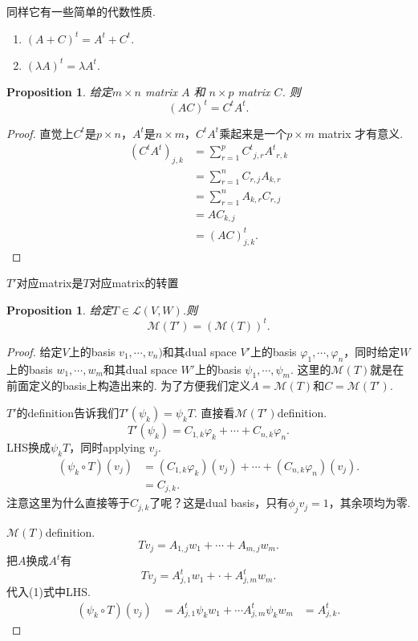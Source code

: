 \documentclass{article}
\newtheorem{proposition}[theorem]{Proposition}
\begin{document}
{\color{red} 同样它有一些简单的代数性质}.
\begin{enumerate}
	\item $(A+C)^t = A^t + C^t.$
	\item $(\lambda A)^t = \lambda A^t.$ 
\end{enumerate}

\begin{proposition}
\rm 给定$m\times n$ matrix $A$ 和 $n \times p$ matrix $C$. 则
$$
	(AC)^t = C^tA^t.
$$
\end{proposition}

\begin{proof}
直觉上$C^t$是$p\times n$，$A^t$是$n \times m$，$C^tA^t$乘起来是一个$p \times m$ matrix 才有意义.
$$
\begin{aligned}
(C^tA^t)_{j,k} &= \sum\limits_{r=1}^p {C^t}_{j,r}{A^t}_{r,k} \\
			&= \sum\limits_{r=1}^n {C}_{r,j}{A}_{k,r} \\
			&= \sum\limits_{r=1}^n {A}_{k,r}{C}_{r,j} \\
			&= AC_{k,j} \\
			&= (AC)^t_{j,k}.
\end{aligned}
$$
\end{proof}

{\color{red} $T'$对应matrix是$T$对应matrix的转置}

\begin{proposition}\label{dual-map: matrix-representation}
给定$T \in \mathcal{L}(V,W)$.则
$$
	\mathcal{M}(T') = (\mathcal{M}(T))^t.
$$
\end{proposition}

\begin{proof}
给定$V$上的basis $v_1,\cdots,v_n)$和其dual space $V'$上的basis $\varphi_1,\cdots,\varphi_n$，同时给定$W$上的basis $w_1,\cdots,w_m$和其dual space $W'$上的basis $\psi_1,\cdots,\psi_m$. 这里的$\mathcal{M}(T)$就是在前面定义的basis上构造出来的. 为了方便我们定义$A = \mathcal{M}(T)$和$C = \mathcal{M}(T')$.

$T'$的definition告诉我们$T'(\psi_k)= \psi_k T$. 直接看$\mathcal{M}(T')$definition.
$$
T'(\psi_k) = C_{1,k}\varphi_k + \cdots + C_{n,k}\varphi_n.
$$
LHS换成$\psi_kT$，同时applying $v_j$.
\begin{equation}
\begin{aligned}
(\psi_k \circ T)(v_j) &= (C_{1,k}\varphi_k)(v_j) + \cdots + (C_{n,k} \varphi_n)(v_j). \\
&= C_{j,k}.
\end{aligned}
\end{equation}
注意这里为什么直接等于$C_{j,k}$了呢？这是dual basis，只有$\phi_jv_j = 1$，其余项均为零.

$\mathcal{M}(T)$definition.
$$
Tv_j = A_{1,j}w_1 + \cdots + A_{m,j}w_m . 
$$
把$A$换成$A^t$有
$$
Tv_j  = A^t_{j,1}w_1 + \cdot + A^t_{j,m}w_m.
$$
代入(1)式中LHS.
$$
\begin{aligned}
(\psi_k \circ T)(v_j) &= A^t_{j,1}\psi_kw_1 + \cdots A^t_{j,m}\psi_kw_m
&= A^t_{j,k}.
\end{aligned}
$$
\end{proof}
\end{document}
